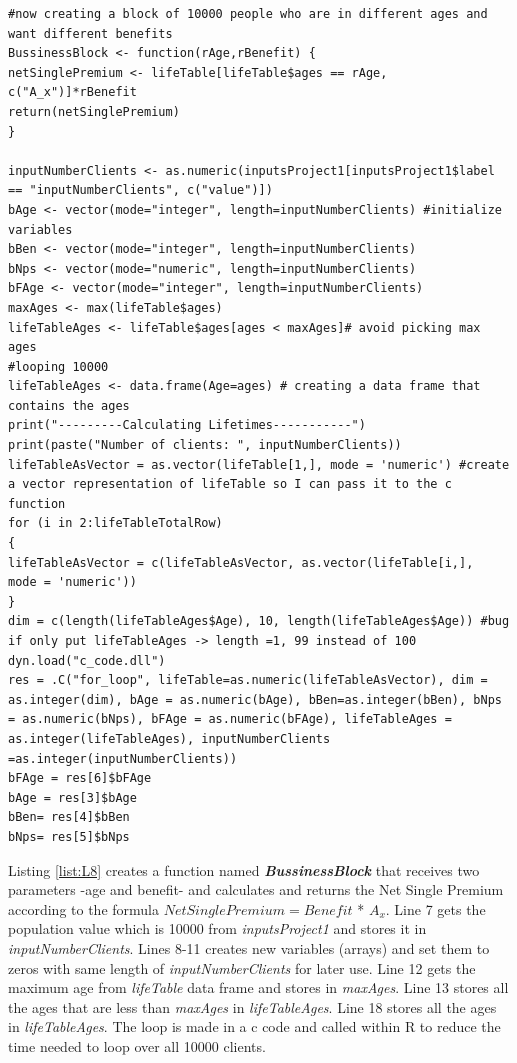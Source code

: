 \documentclass[12pt]{article}
\def\StartLineAtOne{\lstset{firstnumber=1}}
\begin{document}

\StartLineAtOne
\begin{lstlisting}[caption={ 10000 Simulation},captionpos=b,label={list:L8}]
#now creating a block of 10000 people who are in different ages and want different benefits
BussinessBlock <- function(rAge,rBenefit) { 
netSinglePremium <- lifeTable[lifeTable$ages == rAge, c("A_x")]*rBenefit
return(netSinglePremium)
}

inputNumberClients <- as.numeric(inputsProject1[inputsProject1$label == "inputNumberClients", c("value")])
bAge <- vector(mode="integer", length=inputNumberClients) #initialize variables
bBen <- vector(mode="integer", length=inputNumberClients)
bNps <- vector(mode="numeric", length=inputNumberClients)
bFAge <- vector(mode="integer", length=inputNumberClients)
maxAges <- max(lifeTable$ages)
lifeTableAges <- lifeTable$ages[ages < maxAges]# avoid picking max ages
#looping 10000
lifeTableAges <- data.frame(Age=ages) # creating a data frame that contains the ages
print("---------Calculating Lifetimes-----------")
print(paste("Number of clients: ", inputNumberClients))
lifeTableAsVector = as.vector(lifeTable[1,], mode = 'numeric') #create a vector representation of lifeTable so I can pass it to the c function
for (i in 2:lifeTableTotalRow)
{
lifeTableAsVector = c(lifeTableAsVector, as.vector(lifeTable[i,], 
mode = 'numeric'))
}
dim = c(length(lifeTableAges$Age), 10, length(lifeTableAges$Age)) #bug if only put lifeTableAges -> length =1, 99 instead of 100
dyn.load("c_code.dll")
res = .C("for_loop", lifeTable=as.numeric(lifeTableAsVector), dim = as.integer(dim), bAge = as.numeric(bAge), bBen=as.integer(bBen), bNps = as.numeric(bNps), bFAge = as.numeric(bFAge), lifeTableAges = as.integer(lifeTableAges), inputNumberClients =as.integer(inputNumberClients))
bFAge = res[6]$bFAge
bAge = res[3]$bAge
bBen= res[4]$bBen
bNps= res[5]$bNps
\end{lstlisting}

Listing \ref{list:L8} creates a function named \textit{\textbf{BussinessBlock}} that receives two parameters -age and benefit- and calculates  and returns the Net Single Premium according to the formula $Net Single Premium = Benefit$ * $A_{x}$. Line 7 gets the population value which is 10000 from \textit{inputsProject1} and stores it in \textit{inputNumberClients}. Lines 8-11 creates new variables (arrays) and set them to zeros with same length of \textit{inputNumberClients} for later use. Line 12 gets the maximum age from \textit{lifeTable} data frame and stores in \textit{maxAges}. Line 13 stores all the ages that are less than \textit{maxAges} in \textit{lifeTableAges}.  Line 18 stores all the ages in \textit{lifeTableAges}. The loop is made in a c code and called within R to reduce the time needed to loop over all 10000 clients.
\end{document}
